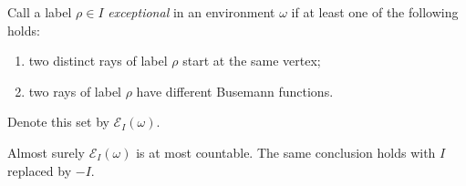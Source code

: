 Call a label $\rho\in I$ \emph{exceptional} in an environment $\omega$
if at least one of the following holds:
\begin{enumerate}[label=(\roman*)]
\item two distinct rays of label $\rho$ start at the same vertex;
\item two rays of label $\rho$ have different Busemann functions.
\end{enumerate}
Denote this set by $\mathcal E_I(\omega)$.

\begin{proposition}
\label{prop:exceptional-countable}
Almost surely $\mathcal E_I(\omega)$ is at most countable.  The same
conclusion holds with $I$ replaced by $-I$.
\end{proposition}

